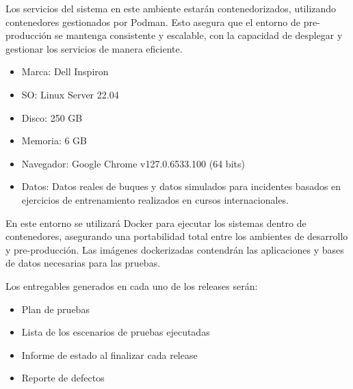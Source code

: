 Los servicios del sistema en este ambiente estarán contenedorizados, utilizando contenedores gestionados por Podman. Esto asegura que el 
entorno de pre-producción se mantenga consistente y escalable, con la capacidad de desplegar y gestionar los servicios de manera eficiente.


\begin{itemize}
    \item Marca: Dell Inspiron
    \item SO: Linux Server 22.04
    \item Disco: 250 GB
    \item Memoria: 6 GB
    \item Navegador: Google Chrome v127.0.6533.100 (64 bits)
    \item Datos: Datos reales de buques y datos simulados para incidentes basados en ejercicios de entrenamiento realizados en cursos internacionales.
\end{itemize}

En este entorno se utilizará Docker para ejecutar los sistemas dentro de contenedores, asegurando una portabilidad total entre los ambientes de desarrollo 
y pre-producción. Las imágenes dockerizadas contendrán las aplicaciones y bases de datos necesarias para las pruebas.


Los entregables generados en cada uno de los releases serán:

\begin{itemize}
    \item Plan de pruebas
    \item Lista de los escenarios de pruebas ejecutadas
    \item Informe de estado al finalizar cada release
    \item Reporte de defectos
\end{itemize}
